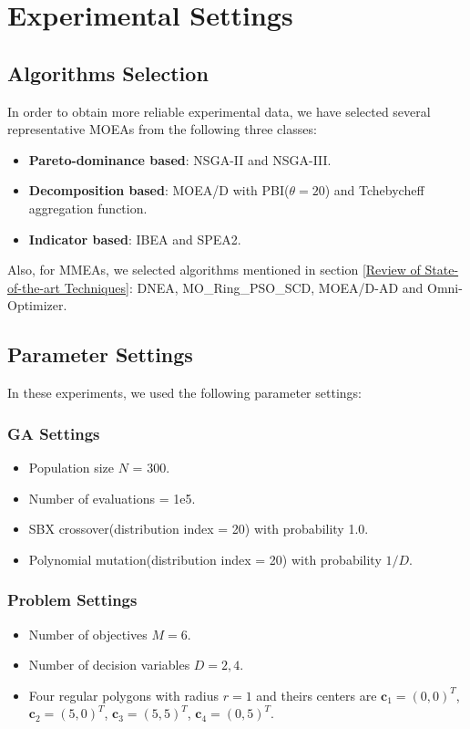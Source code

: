 \documentclass[conference]{IEEEtran}
\begin{document}
\section{Experimental Settings}
\label{Experimental Settings}
\subsection{Algorithms Selection}
In order to obtain more reliable experimental data, we have selected several representative MOEAs from the following three classes:
\begin{itemize}
    \item \textbf{Pareto-dominance based}: NSGA-II\cite{NSGA-II} and NSGA-III\cite{NSGA-III}.
    \item \textbf{Decomposition based}: MOEA/D \cite{MOEA/D} with PBI($\theta=20$) and Tchebycheff aggregation function.
    \item \textbf{Indicator based}: IBEA\cite{IBEA} and SPEA2\cite{SPEA2}.
\end{itemize}

Also, for MMEAs, we selected algorithms mentioned in section \ref{Review of State-of-the-art Techniques}: DNEA, MO\_Ring\_PSO\_SCD, MOEA/D-AD and Omni-Optimizer.
\subsection{Parameter Settings}
In these experiments, we used the following parameter settings: 
\subsubsection{GA Settings}
\begin{itemize}
    \item Population size $N$ = 300.
    \item Number of evaluations = 1e5.
    \item SBX crossover(distribution index = 20) with probability 1.0.
    \item Polynomial mutation(distribution index = 20) with probability $1/D$.
\end{itemize}
\subsubsection{Problem Settings}
\begin{itemize}
     \item Number of objectives $M=6$.
    \item Number of decision variables $D=2, 4$.
    \item Four regular polygons with radius $r=1$ and theirs centers are $\boldsymbol{c}_1=(0, 0)^T$, $\boldsymbol{c}_2=(5, 0)^T$, $\boldsymbol{c}_3=(5, 5)^T$, $\boldsymbol{c}_4=(0, 5)^T$. 
\end{itemize}
\end{document}
